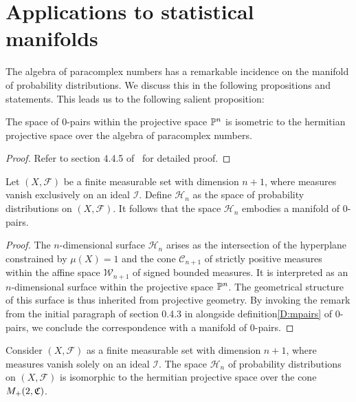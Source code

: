 \section{Applications to statistical manifolds}

The algebra of paracomplex numbers has a remarkable incidence on the manifold of probability distributions. We discuss this in the following propositions and statements. 
This leads us to the following salient proposition:
\begin{proposition}\label{P:isome}
The space of $0$-pairs within the projective space $\mathbb{P}^{n}$ is isometric to the hermitian projective space over the algebra of paracomplex numbers.
\end{proposition}
\begin{proof}
Refer to section 4.4.5 of~\cite{Ro97} for detailed proof.
\end{proof}
\medskip
\begin{proposition}\label{P:zero}
Let $(X, \mathcal{F})$ be a finite measurable set with dimension $n+1$, where measures vanish exclusively on an ideal $\mathcal{I}$. Define $\mathcal{H}_{n}$ as the space of probability distributions on $(X, \mathcal{F})$. It follows that the space $\mathcal{H}_{n}$ embodies a manifold of $0$-pairs.
\end{proposition}
\begin{proof}
The $n$-dimensional surface $\mathcal{H}_{n}$ arises as the intersection of the hyperplane constrained by $\mu(X) = 1$ and the cone $\mathcal{C}_{n+1}$ of strictly positive measures within the affine space $\mathcal{W}_{n+1}$ of signed bounded measures. It is interpreted as an $n$-dimensional surface within the projective space $\mathbb{P}^{n}$. The geometrical structure of this surface is thus inherited from projective geometry. By invoking the remark from the initial paragraph of section 0.4.3 in\cite{Ro97} alongside definition\ref{D:mpairs} of $0$-pairs, we conclude the correspondence with a manifold of $0$-pairs.
\end{proof}
\medskip
\begin{theorem}\label{Th:main}
Consider $(X, \mathcal{F})$ as a finite measurable set with dimension $n+1$, where measures vanish solely on an ideal $\mathcal{I}$. The space $\mathcal{H}_{n}$ of probability distributions on $(X,\mathcal{F})$ is isomorphic to the hermitian projective space over the cone $M_{+}(2,\mathfrak{C})$.
\end{theorem}





